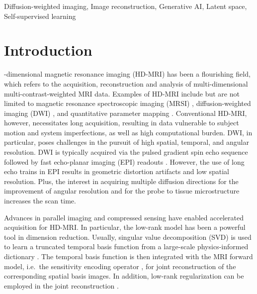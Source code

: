 \documentclass[journal,twoside,web]{ieeecolor}
\begin{document}
	\begin{IEEEkeywords}
	Diffusion-weighted imaging, Image reconstruction, Generative AI, Latent space, Self-supervised learning
	\end{IEEEkeywords}

	\section{Introduction}
	\label{SEC:INTRO}
	-dimensional magnetic resonance imaging (HD-MRI)
	has been a flourishing field,
	which refers to the acquisition, reconstruction and analysis of
	multi-dimensional multi-contrast-weighted MRI data.
	Examples of HD-MRI include but are not limited to
	magnetic resonance spectroscopic imaging (MRSI)
	\cite{brown_1982_mrsi},
	diffusion-weighted imaging (DWI)
	\cite{lebihan_1986_diff,merboldt_1985_diff},
	and quantitative parameter mapping
	\cite{doneva_2010_moba,ma_2013_mrf}.
	Conventional HD-MRI, however, necessitates long acquisition,
	resulting in data vulnerable to subject motion
	and system imperfections, as well as high computational burden.
	DWI, in particular, poses challenges in the pursuit of
	high spatial, temporal, and angular resolution.
	DWI is typically acquired via
	the pulsed gradient spin echo sequence \cite{stejskal_1965_pgse}
	followed by fast echo-planar imaging (EPI) readouts
	\cite{mansfield_1977_epi}.
	However, the use of long echo trains in EPI results in
	geometric distortion artifacts and low spatial resolution.
	Plus, the interest in acquiring multiple diffusion directions
	for the improvement of angular resolution and
	for the probe to tissue microstructure increases the scan time.

	Advances in parallel imaging
	\cite{roemer_1990_pi,sodickson_1997_smash,
	pruessmann_1999_sense,pruessmann_2001_gsense,griswold_2002_grappa}
	and compressed sensing
	\cite{lustig_2007_cs,block_2007_cs,liang_2007_psf}
	have enabled accelerated acquisition for HD-MRI.
	In particular, the low-rank model \cite{cai_2010_svt}
	has been a powerful tool in dimension reduction.
	Usually, singular value decomposition (SVD) is used to
	learn a truncated temporal basis function from
	a large-scale physics-informed dictionary
	\cite{huang_2012_t2basis,lam_2014_spice,mcgivney_2014_svdmrf}.
	The temporal basis function is then integrated
	with the MRI forward model,
	i.e.~the sensitivity encoding operator \cite{pruessmann_2001_gsense},
	for joint reconstruction of the corresponding spatial basis images.
	In addition, low-rank regularization can be employed
	in the joint reconstruction \cite{tamir_2017_t2shuffling}.
\end{document}
